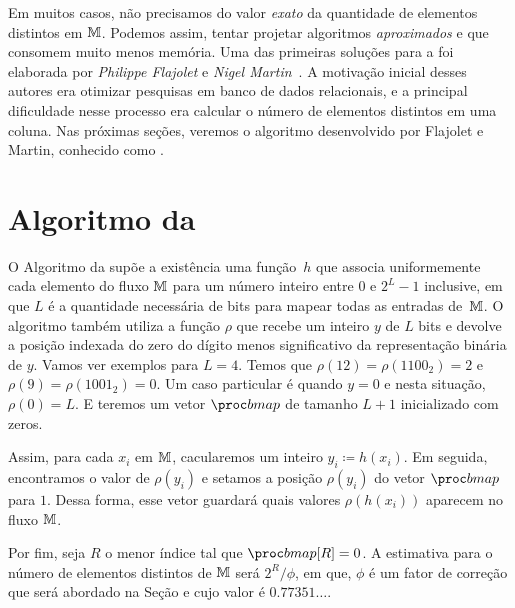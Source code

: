 Em muitos casos, não precisamos do valor \textit{exato} da quantidade de elementos distintos em $\mathbb{M}$. Podemos assim, 
tentar projetar algoritmos \textit{aproximados} e que consomem muito menos memória. Uma das primeiras soluções para a 
 foi elaborada por \textit{Philippe Flajolet} e 
\textit{Nigel Martin}~\citep{flajolet:martin:85}. A motivação inicial desses autores era otimizar pesquisas em banco de
dados relacionais, e a principal dificuldade nesse processo era calcular o número de elementos distintos em uma coluna.
Nas próximas seções, veremos o algoritmo desenvolvido por Flajolet e Martin, conhecido como 
.

\section{Algoritmo da }
\label{sec:flajolet-martin:algorithm}

O Algoritmo da  supõe a existência uma função~$h$ que associa uniformemente cada elemento 
do fluxo $\mathbb{M}$ para um número inteiro entre $0$ e $2^L-1$ inclusive, em que $L$ é a quantidade necessária de bits para 
mapear todas as entradas de~$\mathbb{M}$. O algoritmo também utiliza a função $\rho$ que recebe um inteiro $y$ de $L$ bits e 
devolve a posição indexada do zero do dígito menos significativo da representação binária de $y$. Vamos ver exemplos 
para $L = 4$. Temos que $\rho(12) = \rho(1100_2) = 2$ e $\rho(9) = \rho(1001_2) = 0$. Um caso particular é quando 
$y = 0$ e nesta situação, $\rho(0) = L$. E teremos um vetor $\bitmap$ de tamanho $L + 1$ inicializado com zeros.

Assim, para cada $x_i$ em $\mathbb{M}$, cacularemos um inteiro $y_i \coloneqq h(x_i)$. Em seguida, encontramos o valor de 
$\rho(y_i)$ e setamos a posição $\rho(y_i)$ do vetor $\bitmap$ para $1$. Dessa forma, esse vetor guardará quais valores 
$\rho(h(x_i))$ aparecem no fluxo $\mathbb{M}$.

Por fim, seja $R$ o menor índice tal que $\bitmap[R] = 0$. A estimativa para o número de elementos distintos de 
$\mathbb{M}$ será $2^R/\phi$, em que, $\phi$ é um fator de correção que será abordado na Seção 
 e cujo valor é $0.77351\dots$.

